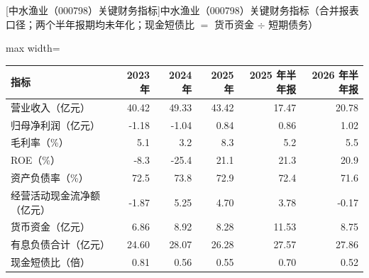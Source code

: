 \begin{center}\small\setlength{\tabcolsep}{3.4pt}
[中水渔业（000798）关键财务指标]{中水渔业（000798）关键财务指标（合并报表口径；两个半年报期均未年化；现金短债比 $=$ 货币资金 $\div$ 短期债务）}
\begin{adjustbox}{max width=\textwidth}
\begin{tabular}{@{}lrrrrr@{}}
\toprule
指标 & 2023 年 & 2024 年 & 2025 年 & 2025 年半年报 & 2026 年半年报 \\
\midrule
营业收入（亿元） & 40.42 & 49.33 & 43.42 & 17.47 & 20.78 \\
归母净利润（亿元） & -1.18 & -1.04 & 0.84 & 0.86 & 1.02 \\
毛利率（\%） & 5.1 & 3.2 & 8.3 & 5.2 & 5.5 \\
ROE（\%） & -8.3 & -25.4 & 21.1 & 21.3 & 20.9 \\
资产负债率（\%） & 72.5 & 73.8 & 72.9 & 72.4 & 71.6 \\
经营活动现金流净额（亿元） & -1.87 & 5.25 & 4.70 & 3.78 & -0.17 \\
货币资金（亿元） & 6.86 & 8.92 & 8.28 & 11.53 & 8.75 \\
有息负债合计（亿元） & 24.60 & 28.07 & 26.28 & 27.57 & 27.86 \\
现金短债比（倍） & 0.81 & 0.56 & 0.55 & 0.70 & 0.52 \\
\bottomrule
\end{tabular}
\end{adjustbox}
\end{center}

